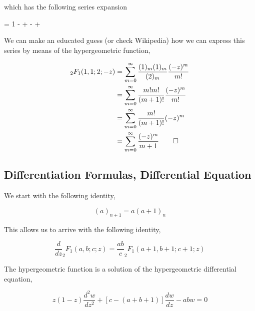 \bee
{}
\eee

which has the following series expansion

\bee
{} = 1 -  +  -  +  \mp \cdots
\eee

We can make an educated guess (or check Wikipedia) how we can express this series by means of the hypergeometric function,

\begin{align*}
_2F_1(1,1;2;-z) &= \sum_{m=0}^\infty \frac{(1)_m (1)_m}{(2)_m} \frac{(-z)^m}{m!} \\
&= \sum_{m=0}^\infty \frac{m! m!}{(m+1)!} \frac{(-z)^m}{m!} \\
&= \sum_{m=0}^\infty \frac{m!}{(m+1)!} (-z)^m \\
&= \sum_{m=0}^\infty \frac{(-z)^m}{m+1} \qed
\end{align*}

\subsection{Differentiation Formulas, Differential Equation}

We start with the following identity,

\begin{equation*}
    (a)_{n+1} = a (a+1)_n
\end{equation*}

This allows us to arrive with the following identity,

\begin{equation*}
    \frac{d}{dz} _2 F_1(a,b;c;z) = \frac{ab}{c} _2 F_1(a+1,b+1;c+1;z)
\end{equation*}

The hypergeometric function is a solution of the hypergeometric differential equation,

\begin{equation*}
    z(1-z) \frac{d^2 w}{dz^2} + \left[c - (a+b+1)\right] \frac{dw}{dz} - abw = 0
\end{equation*}




